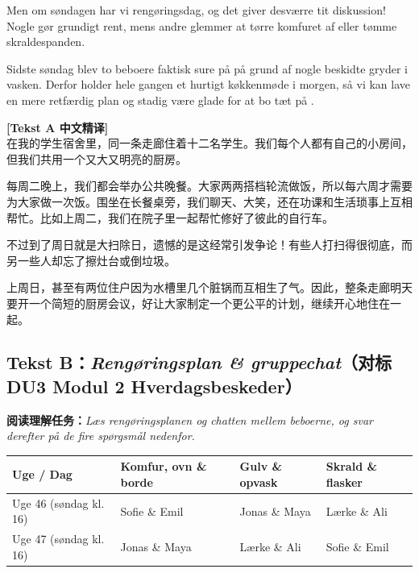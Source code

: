 Men om søndagen har vi rengøringsdag, og det giver desværre tit diskussion! Nogle gør grundigt rent, mens andre glemmer at tørre komfuret af eller tømme skraldespanden.

Sidste søndag blev to beboere faktisk sure på  på grund af nogle beskidte gryder i vasken. Derfor holder hele gangen et hurtigt køkkenmøde i morgen, så vi kan lave en mere retfærdig plan og stadig være glade for at bo tæt på .

\begin{transbox}
\small
\textbf{\color{NCDTeal}[Tekst A 中文精译]}\\
在我的学生宿舍里，同一条走廊住着十二名学生。我们每个人都有自己的小房间，但我们共用一个又大又明亮的厨房。

每周二晚上，我们都会举办公共晚餐。大家两两搭档轮流做饭，所以每六周才需要为大家做一次饭。围坐在长餐桌旁，我们聊天、大笑，还在功课和生活琐事上互相帮忙。比如上周二，我们在院子里一起帮忙修好了彼此的自行车。

不过到了周日就是大扫除日，遗憾的是这经常引发争论！有些人打扫得很彻底，而另一些人却忘了擦灶台或倒垃圾。

上周日，甚至有两位住户因为水槽里几个脏锅而互相生了气。因此，整条走廊明天要开一个简短的厨房会议，好让大家制定一个更公平的计划，继续开心地住在一起。
\end{transbox}

\subsection*{Tekst B：\textit{Rengøringsplan \& gruppechat}（对标 DU3 Modul 2 Hverdagsbeskeder）}

\textbf{阅读理解任务：}\textit{Læs rengøringsplanen og chatten mellem beboerne, og svar derefter på de fire spørgsmål nedenfor.}

\vspace{0.3em}
\renewcommand{\arraystretch}{1.22}
{\small
\begin{tabularx}{\linewidth}{@{} l X X X @{}}
\toprule
\textbf{Uge / Dag} & \textbf{Komfur, ovn \& borde} & \textbf{Gulv \& opvask} & \textbf{Skrald \& flasker} \\
\midrule
Uge 46 (søndag kl. 16) & Sofie \& Emil & Jonas \& Maya & Lærke \& Ali \\
Uge 47 (søndag kl. 16) & Jonas \& Maya & Lærke \& Ali & Sofie \& Emil \\
\bottomrule
\end{tabularx}
}

